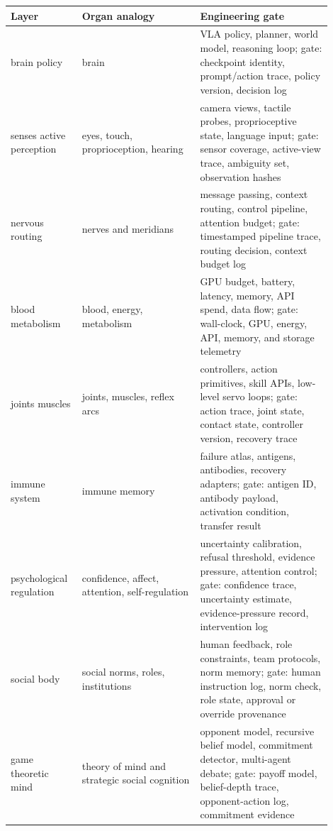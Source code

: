 \begin{tabular}{p{0.18\linewidth}p{0.34\linewidth}p{0.38\linewidth}}
\toprule
Layer & Organ analogy & Engineering gate \\
\midrule
brain policy & brain & VLA policy, planner, world model, reasoning loop; gate: checkpoint identity, prompt/action trace, policy version, decision log \\
senses active perception & eyes, touch, proprioception, hearing & camera views, tactile probes, proprioceptive state, language input; gate: sensor coverage, active-view trace, ambiguity set, observation hashes \\
nervous routing & nerves and meridians & message passing, context routing, control pipeline, attention budget; gate: timestamped pipeline trace, routing decision, context budget log \\
blood metabolism & blood, energy, metabolism & GPU budget, battery, latency, memory, API spend, data flow; gate: wall-clock, GPU, energy, API, memory, and storage telemetry \\
joints muscles & joints, muscles, reflex arcs & controllers, action primitives, skill APIs, low-level servo loops; gate: action trace, joint state, contact state, controller version, recovery trace \\
immune system & immune memory & failure atlas, antigens, antibodies, recovery adapters; gate: antigen ID, antibody payload, activation condition, transfer result \\
psychological regulation & confidence, affect, attention, self-regulation & uncertainty calibration, refusal threshold, evidence pressure, attention control; gate: confidence trace, uncertainty estimate, evidence-pressure record, intervention log \\
social body & social norms, roles, institutions & human feedback, role constraints, team protocols, norm memory; gate: human instruction log, norm check, role state, approval or override provenance \\
game theoretic mind & theory of mind and strategic social cognition & opponent model, recursive belief model, commitment detector, multi-agent debate; gate: payoff model, belief-depth trace, opponent-action log, commitment evidence \\
\bottomrule
\end{tabular}
